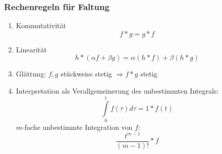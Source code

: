 \documentclass[a4paper,twocolumn,10pt]{article}
\begin{document}
\subsubsection{Rechenregeln für Faltung}
\begin{enumerate}[label=$\bullet$]
\item Kommutativität
\begin{equation*}
f*g=g*f
\end{equation*}
\item Linearität
\begin{equation*}
h*(\alpha f+\beta g)=\alpha(h*f)+\beta(h*g)
\end{equation*}
\item Glättung: $f,g$ stückweise stetig $\Rightarrow f*g$ stetig
\item Interpretation als Verallgemeinerung des unbestimmten Integrals:
\begin{equation*}
\int\limits_{0}^{t}f(\tau)d\tau=1*f(t)
\end{equation*}
$m$-fache unbestimmte Integration von $f$:
\begin{equation*}
\frac{t^{m-1}}{(m-1)!}*f
\end{equation*}
\end{enumerate}
\end{document}
